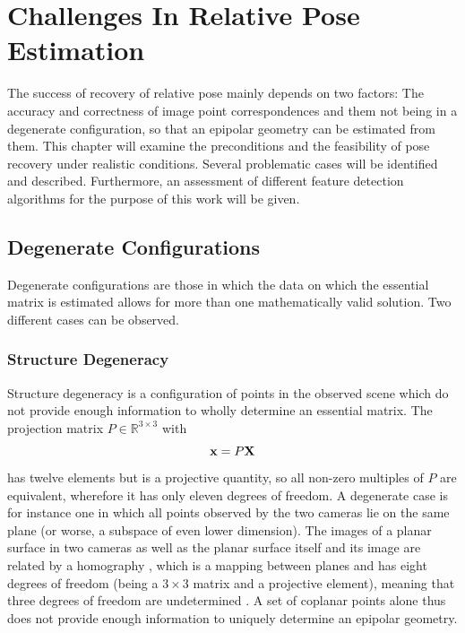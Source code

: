 \chapter{Challenges In Relative Pose Estimation}

The success of recovery of relative pose mainly depends on two factors: The
accuracy and correctness of image point correspondences and them not being in a
degenerate configuration, so that an epipolar geometry can be estimated from
them.  This chapter will examine the preconditions and the feasibility of pose
recovery under realistic conditions. Several problematic cases will be identified
and described. Furthermore, an assessment of different feature detection
algorithms for the purpose of this work will be given.

\section{Degenerate Configurations}

Degenerate configurations are those in which the data on which the essential
matrix is estimated allows for more than one mathematically valid solution. Two
different cases can be observed.

\subsection{Structure Degeneracy}

Structure degeneracy is a configuration of points in the observed scene which do
not provide enough information to wholly determine an essential matrix. The
projection matrix $P\in\mathbb{R}^{3\times3}$ with 
\begin{equation*}
   \mathbf{x} = P\mathbf{X}
\end{equation*}
has twelve elements but is a projective quantity, so all non-zero multiples of
$P$ are equivalent, wherefore it has only eleven degrees of freedom.  A
degenerate case is for instance one in which all points observed by the two cameras lie
on the same plane (or worse, a subspace of even lower dimension). The images of
a planar surface in two cameras as well as the planar surface itself and its
image are related by a homography \citep[see][ch. 13]{h&z2004}, which is a
mapping between planes and has eight degrees of freedom (being a $3\times3$
matrix and a projective element), meaning that three degrees of freedom are
undetermined \citep{torr1999}. A set of coplanar points alone thus does not provide
enough information to uniquely determine an epipolar geometry.

